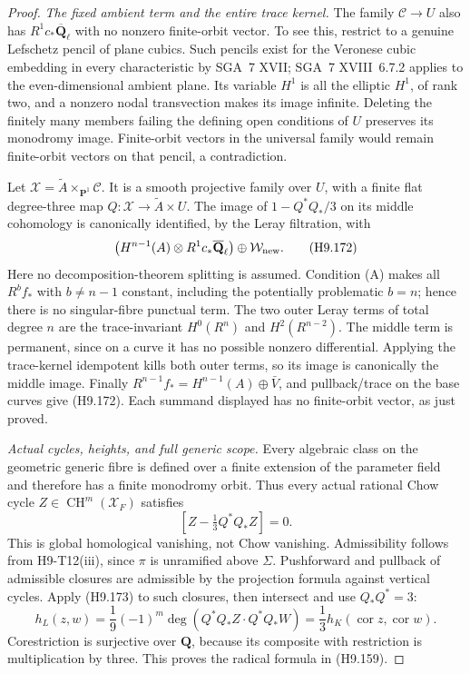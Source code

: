\begin{proof}
\emph{The fixed ambient term and the entire trace kernel.}
The family $\mathcal C\to U$ also has
$R^1c_*\overline{\mathbf Q}_\ell$ with no nonzero finite-orbit
vector. To see this, restrict to a genuine Lefschetz pencil
of plane cubics. Such pencils exist for the Veronese cubic
embedding in every characteristic by SGA~7 XVII; SGA~7
XVIII~6.7.2 applies to the even-dimensional ambient plane.
Its variable $H^1$ is all the elliptic $H^1$, of rank two,
and a nonzero nodal transvection makes its image infinite.
Deleting the finitely many members failing the defining
open conditions of $U$ preserves its monodromy image.
Finite-orbit vectors in the universal family would remain
finite-orbit vectors on that pencil, a contradiction.

Let $\mathcal X=\widetilde A\times_{\mathbf P^1}\mathcal C$.
It is a smooth projective family over $U$, with a finite
flat degree-three map $Q:\mathcal X\to\widetilde A\times U$.
The image of $1-Q^*Q_*/3$ on its middle cohomology is
canonically identified, by the Leray filtration, with
\[
 \bigl(H^{n-1}(A)\otimes R^1c_*\overline{\mathbf Q}_\ell\bigr)
                         \oplus\mathcal W_{\rm new}.
                                                               \tag{H9.172}
\]
Here no decomposition-theorem splitting is assumed.
Condition (A) makes all $R^bf_*$ with $b\ne n-1$ constant,
including the potentially problematic $b=n$; hence there
is no singular-fibre punctual term. The two outer Leray
terms of total degree $n$ are the trace-invariant
$H^0(R^n)$ and $H^2(R^{n-2})$. The middle term is permanent,
since on a curve it has no possible nonzero differential.
Applying the trace-kernel idempotent kills both outer terms,
so its image is canonically the middle image. Finally
$R^{n-1}f_*=H^{n-1}(A)\oplus\bar V$, and pullback/trace
on the base curves give (H9.172). Each summand displayed
has no finite-orbit vector, as just proved.

\emph{Actual cycles, heights, and full generic scope.}
Every algebraic class on the geometric generic fibre is
defined over a finite extension of the parameter field and
therefore has a finite monodromy orbit. Thus every actual
rational Chow cycle $Z\in\operatorname{CH}^m(\mathcal X_F)$
satisfies
\[
                   [Z-\tfrac13Q^*Q_*Z]=0.
                                                               \tag{H9.173}
\]
This is global homological vanishing, not Chow vanishing.
Admissibility follows from H9-T12(iii), since $\pi$ is
unramified above $\Sigma$. Pushforward and pullback of
admissible closures are admissible by the projection
formula against vertical cycles. Apply (H9.173) to such
closures, then intersect and use $Q_*Q^*=3$:
\[
 h_L(z,w)=\frac1{9}(-1)^m
          \deg(Q^*Q_*Z\cdot Q^*Q_*W)
        =\frac13h_K(\operatorname{cor}z,\operatorname{cor}w).
                                                               \tag{H9.174}
\]
Corestriction is surjective over $\mathbf Q$, because its
composite with restriction is multiplication by three.
This proves the radical formula in (H9.159).


\end{proof}
